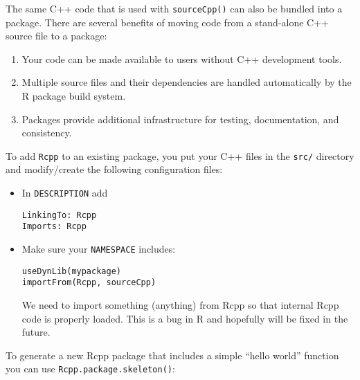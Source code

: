 
The same C++ code that is used with \texttt{sourceCpp()} can also be
bundled into a package. There are several benefits of moving code from a
stand-alone C++ source file to a package: 

\begin{enumerate}
\def\labelenumi{\arabic{enumi}.}
\item
  Your code can be made available to users without C++ development
  tools.
\item
  Multiple source files and their dependencies are handled automatically
  by the R package build system.
\item
  Packages provide additional infrastructure for testing, documentation,
  and consistency.
\end{enumerate}

To add \texttt{Rcpp} to an existing package, you put your C++ files in
the \texttt{src/} directory and modify/create the following
configuration files:

\begin{itemize}
\item
  In \texttt{DESCRIPTION} add

\begin{verbatim}
LinkingTo: Rcpp
Imports: Rcpp
\end{verbatim}
\item
  Make sure your \texttt{NAMESPACE} includes:

\begin{verbatim}
useDynLib(mypackage)
importFrom(Rcpp, sourceCpp)
\end{verbatim}

  We need to import something (anything) from Rcpp so that internal Rcpp
  code is properly loaded. This is a bug in R and hopefully will be
  fixed in the future.
\end{itemize}

To generate a new Rcpp package that includes a simple ``hello world''
function you can use \texttt{Rcpp.package.skeleton()}:

\begin{Shaded}
\begin{Highlighting}[]
\NormalTok{(}\NormalTok{, } \NormalTok{)}
\end{Highlighting}
\end{Shaded}

